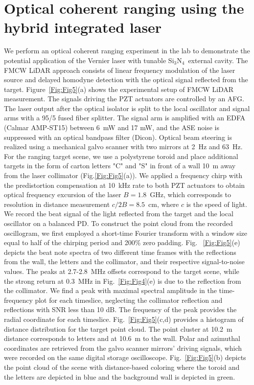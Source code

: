 \documentclass[9pt,twocolumn,twoside, superscriptaddress]{revtex4-2}
\newcommand{\SiN}[0]{Si$_3$N$_4$~}
\begin{document}
\section{Optical coherent ranging using the hybrid integrated laser}
We perform an optical coherent ranging experiment in the lab to demonstrate the potential application of the Vernier laser with tunable \SiN external cavity.
The FMCW LiDAR approach consists of linear frequency modulation of the laser source and delayed homodyne detection with the optical signal reflected from the target.
Figure~\ref{Fig:Fig5}(a) shows the experimental setup of FMCW LiDAR measurement.
The signals driving the PZT actuators are controlled by an AFG.
The laser output after the optical isolator is split to the local oscillator and signal arms with a 95/5 fused fiber splitter.
The signal arm is amplified with an EDFA (Calmar AMP-ST15) between 6~mW and 17 mW, and the ASE noise is suppressed with an optical bandpass filter (Dicon).
Optical beam steering is realized using a mechanical galvo scanner with two mirrors at 2~Hz and 63~Hz.
For the ranging target scene, we use a polystyrene toroid and place additional targets in the form of carton letters "C" and "S" in front of a wall 10~m away from the laser collimator (Fig.\ref{Fig:Fig5}(a)).
We applied a frequency chirp with the predistortion compensation at 10~kHz rate to both PZT actuators to obtain optical frequency excursion of the laser $B = 1.8$~GHz, which corresponds to resolution in distance measurement $c/2B=8.5$~cm, where $c$ is the speed of light.
We record the beat signal of the light reflected from the target and the local oscillator on a balanced PD.
To construct the point cloud from the recorded oscillogram, we first employed a short-time Fourier transform with a window size equal to half of the chirping period and 200\% zero padding.
Fig. ~\ref{Fig:Fig5}(e) depicts the beat note spectra of two different time frames with the reflections from the wall, the letters and the collimator, and their respective signal-to-noise values.
The peaks at 2.7-2.8~MHz offsets correspond to the target scene, while the strong return at 0.3~MHz in Fig.~\ref{Fig:Fig4}(e) is due to the reflection from the collimator.
We find a peak with maximal spectral amplitude in the time-frequency plot for each timeslice, neglecting the collimator reflection and reflections with SNR less than 10 dB.
The frequency of the peak provides the radial coordinate for each timeslice.
Fig.~{\ref{Fig:Fig5}(c,d)} provides a histogram of distance distribution for the target point cloud.
The point cluster at 10.2~m distance corresponds to letters and at 10.6~m to the wall. 
Polar and azimuthal coordinates are retrieved from the galvo scanner mirrors' driving signals, which were recorded on the same digital storage oscilloscope.
Fig.~\ref{Fig:Fig5}(b) depicts the point cloud of the scene with distance-based coloring where the toroid and the letters are depicted in blue and the background wall is depicted in green.
\end{document}
